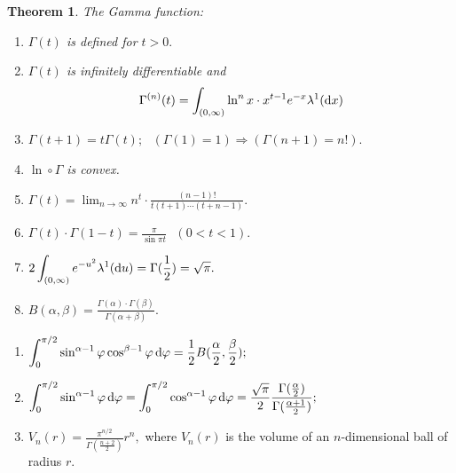 \documentclass[11pt, a4paper, openany]{book}
\newtheorem{thm}{Theorem}\newtheorem{lem}{Lemma}\newtheorem{crl}{Corollary}
\theoremstyle{definition}
\begin{document}
    \begin{thm}
        The Gamma function:
        \begin{enumerate}
        \item $\Gamma(t)$ is defined for $t>0.$
        \item $\Gamma(t)$ is infinitely differentiable and
        \[
            \Gamma^{(n)}(t)=\int_{(0,\infty)}\ln^nx\cdot x^{t-1} e^{-x}\lambda^1(\odif x)
        \]
        \item $\Gamma(t+1)=t\Gamma(t);\,\,\,\,(\Gamma(1)=1)\Longrightarrow(\Gamma(n+1)=n!).$ 
        \item $\ln\circ\Gamma$ is convex.
        \item $\displaystyle \Gamma(t)=\lim_{n\to\infty}n^t\cdot\frac{(n-1)!}{t(t+1)\cdots(t+n-1)}.$
        \item $\displaystyle \Gamma(t)\cdot\Gamma(1-t)=\frac{\pi}{\sin{\pi t}}\,\,\,\,(0<t<1).$
        \item $\displaystyle 2\int_{(0,\infty)}e^{-u^2}\lambda^1(\odif u)=\Gamma(\frac{1}{2})=\sqrt{\pi}.$
        \item $\displaystyle B(\alpha,\beta)=\frac{\Gamma(\alpha)\cdot\Gamma(\beta)}{\Gamma(\alpha+\beta)}.$
    \end{enumerate}
    \end{thm}
    \begin{enumerate}
        \item $\displaystyle
        \int_{0}^{\pi/2}\sin^{\alpha-1}\varphi\cos^{\beta-1}\varphi\odif{\varphi}=\frac{1}{2}B(\frac{\alpha}{2},\frac{\beta}{2});$
        \item $\displaystyle
        \int_{0}^{\pi/2}\sin^{\alpha-1}\varphi\odif{\varphi}=\int_{0}^{\pi/2}\cos^{\alpha-1}\varphi\odif{\varphi}=
        \frac{\sqrt{\pi}}{2}\frac{\Gamma(\frac{\alpha}{2})}{\Gamma(\frac{\alpha+1}{2})};$
        \item $\displaystyle
        V_n(r)=\frac{\pi^{n/2}}{\Gamma(\frac{n+2}{2})}r^n,$ where $V_n(r)$ is the volume of an $n$-dimensional ball of radius $r$.
    \end{enumerate}
\end{document}
